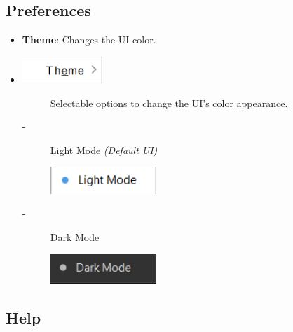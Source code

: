 \documentclass{article}
\begin{document}
\subsection{Preferences}

\begin{itemize}
    \item \textbf{Theme}: Changes the UI color.
    \item[] \includegraphics[width=3cm]{Images/Preferences_Theme.png}
    \begin{description}
        \item[] Selectable options to change the UI's color appearance.
            \item[-] Light Mode \textit{(Default UI)}
            \item[] \includegraphics[width=4cm]{Images/Selected_LightMode.png}
            \item[-] Dark Mode
            \item[] \includegraphics[width=4cm]{Images/Selected_DarkMode.png}
    \end{description}
\end{itemize}

\subsection{Help}
\end{document}
